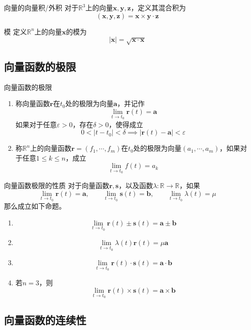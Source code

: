 \documentclass[lang = cn, scheme = chinese, thmcnt = section]{elegantbook}
\newcommand{\R}{\mathbb{R}}            %
\newcommand{\bs}{\boldsymbol}          %
\begin{document}
\begin{definition}{向量的向量积/外积}
	对于$\R^3$上的向量$\bs{x},\bs{y},\bs{z}$，定义其混合积为
	$$
	(\bs{x},\bs{y},\bs{z})=\bs{x}\times \bs{y}\cdot \bs{z}
	$$
\end{definition}

\begin{definition}{模}
	定义$\R^n$上的向量$\bs{x}$的模为
	$$
	|\bs{x}|=\sqrt{\bs{x}\cdot \bs{x}}
	$$
\end{definition}

\subsection{向量函数的极限}

\begin{definition}{向量函数的极限}
	\begin{enumerate}
		\item 称向量函数$\bs{r}$在$t_0$处的极限为向量$\bs{a}$，并记作
		$$
		\lim_{t\to t_0}\bs{r}(t)=\bs{a}
		$$
		如果对于任意$\varepsilon>0$，存在$\delta>0$，使得成立
		$$
		0<|t-t_0|<\delta\implies |\bs{r}(t)-\bs{a}|<\varepsilon
		$$
		\item 称$\R^n$上的向量函数$\bs{r}=(f_1,\cdots,f_m)$在$t_0$处的极限为向量$(a_1,\cdots,a_m)$，如果对于任意$1\le k \le n$，成立
		$$
		\lim_{t\to t_0}f(t)=a_k
		$$
	\end{enumerate}
\end{definition}

\begin{proposition}{向量函数极限的性质}
	对于向量函数$\bs{r},\bs{s}$，以及函数$\lambda:\R\to\R$，如果
	$$
	\lim_{t\to t_0}\bs{r}(t)=\bs{a},\qquad
	\lim_{t\to t_0}\bs{s}(t)=\bs{b},\qquad
	\lim_{t\to t_0}\lambda(t)=\mu
	$$
	那么成立如下命题。
	\begin{enumerate}
		\item 
		$$
		\lim_{t\to t_0}\bs{r}(t)\pm\bs{s}(t)=\bs{a}\pm\bs{b}
		$$
		\item 
		$$
		\lim_{t\to t_0}\lambda(t)\bs{r}(t)=\mu\bs{a}
		$$
		\item 
		$$
		\lim_{t\to t_0}\bs{r}(t)\cdot\bs{s}(t)=\bs{a}\cdot\bs{b}
		$$
		\item 若$n=3$，则
		$$
		\lim_{t\to t_0}\bs{r}(t)\times\bs{s}(t)=\bs{a}\times\bs{b}
		$$
	\end{enumerate}
\end{proposition}

\subsection{向量函数的连续性}
\end{document}
